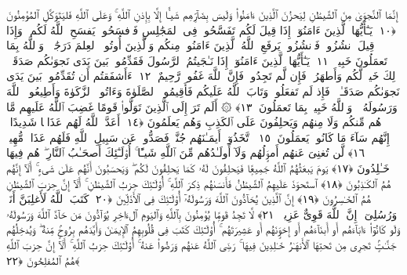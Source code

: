  إِنَّمَا ٱلنَّجوَىٰ مِنَ ٱلشَّيطَٰنِ لِيَحزُنَ ٱلَّذِينَ ءَامَنُوا۟ وَلَيسَ بِضَآرِّهِم شَيـًٔا إِلَّا بِإِذنِ ٱللَّهِ ۚ وَعَلَى ٱللَّهِ فَليَتَوَكَّلِ ٱلمُؤمِنُونَ ﴿١٠﴾
 يَـٰٓأَيُّهَا ٱلَّذِينَ ءَامَنُوٓا۟ إِذَا قِيلَ لَكُم تَفَسَّحُوا۟ فِى ٱلمَجَٰلِسِ فَٱفسَحُوا۟ يَفسَحِ ٱللَّهُ لَكُم ۖ وَإِذَا قِيلَ ٱنشُزُوا۟ فَٱنشُزُوا۟ يَرفَعِ ٱللَّهُ ٱلَّذِينَ ءَامَنُوا۟ مِنكُم وَٱلَّذِينَ أُوتُوا۟ ٱلعِلمَ دَرَجَٰتٍۢ ۚ وَٱللَّهُ بِمَا تَعمَلُونَ خَبِيرٌۭ ﴿١١﴾
 يَـٰٓأَيُّهَا ٱلَّذِينَ ءَامَنُوٓا۟ إِذَا نَـٰجَيتُمُ ٱلرَّسُولَ فَقَدِّمُوا۟ بَينَ يَدَى نَجوَىٰكُم صَدَقَةًۭ ۚ ذَٟلِكَ خَيرٌۭ لَّكُم وَأَطهَرُ ۚ فَإِن لَّم تَجِدُوا۟ فَإِنَّ ٱللَّهَ غَفُورٌۭ رَّحِيمٌ ﴿١٢﴾
 ءَأَشفَقتُم أَن تُقَدِّمُوا۟ بَينَ يَدَى نَجوَىٰكُم صَدَقَـٰتٍۢ ۚ فَإِذ لَم تَفعَلُوا۟ وَتَابَ ٱللَّهُ عَلَيكُم فَأَقِيمُوا۟ ٱلصَّلَوٰةَ وَءَاتُوا۟ ٱلزَّكَوٰةَ وَأَطِيعُوا۟ ٱللَّهَ وَرَسُولَهُۥ ۚ وَٱللَّهُ خَبِيرٌۢ بِمَا تَعمَلُونَ ﴿١٣﴾
 ۞ أَلَم تَرَ إِلَى ٱلَّذِينَ تَوَلَّوا۟ قَومًا غَضِبَ ٱللَّهُ عَلَيهِم مَّا هُم مِّنكُم وَلَا مِنهُم وَيَحلِفُونَ عَلَى ٱلكَذِبِ وَهُم يَعلَمُونَ ﴿١٤﴾
 أَعَدَّ ٱللَّهُ لَهُم عَذَابًۭا شَدِيدًا ۖ إِنَّهُم سَآءَ مَا كَانُوا۟ يَعمَلُونَ ﴿١٥﴾
 ٱتَّخَذُوٓا۟ أَيمَـٰنَهُم جُنَّةًۭ فَصَدُّوا۟ عَن سَبِيلِ ٱللَّهِ فَلَهُم عَذَابٌۭ مُّهِينٌۭ ﴿١٦﴾
 لَّن تُغنِىَ عَنهُم أَموَٟلُهُم وَلَآ أَولَـٰدُهُم مِّنَ ٱللَّهِ شَيـًٔا ۚ أُو۟لَـٰٓئِكَ أَصحَـٰبُ ٱلنَّارِ ۖ هُم فِيهَا خَـٰلِدُونَ ﴿١٧﴾
 يَومَ يَبعَثُهُمُ ٱللَّهُ جَمِيعًۭا فَيَحلِفُونَ لَهُۥ كَمَا يَحلِفُونَ لَكُم ۖ وَيَحسَبُونَ أَنَّهُم عَلَىٰ شَىءٍ ۚ أَلَآ إِنَّهُم هُمُ ٱلكَـٰذِبُونَ ﴿١٨﴾
 ٱستَحوَذَ عَلَيهِمُ ٱلشَّيطَٰنُ فَأَنسَىٰهُم ذِكرَ ٱللَّهِ ۚ أُو۟لَـٰٓئِكَ حِزبُ ٱلشَّيطَٰنِ ۚ أَلَآ إِنَّ حِزبَ ٱلشَّيطَٰنِ هُمُ ٱلخَـٰسِرُونَ ﴿١٩﴾
 إِنَّ ٱلَّذِينَ يُحَآدُّونَ ٱللَّهَ وَرَسُولَهُۥٓ أُو۟لَـٰٓئِكَ فِى ٱلأَذَلِّينَ ﴿٢٠﴾
 كَتَبَ ٱللَّهُ لَأَغلِبَنَّ أَنَا۠ وَرُسُلِىٓ ۚ إِنَّ ٱللَّهَ قَوِىٌّ عَزِيزٌۭ ﴿٢١﴾
 لَّا تَجِدُ قَومًۭا يُؤمِنُونَ بِٱللَّهِ وَٱليَومِ ٱلءَاخِرِ يُوَآدُّونَ مَن حَآدَّ ٱللَّهَ وَرَسُولَهُۥ وَلَو كَانُوٓا۟ ءَابَآءَهُم أَو أَبنَآءَهُم أَو إِخوَٟنَهُم أَو عَشِيرَتَهُم ۚ أُو۟لَـٰٓئِكَ كَتَبَ فِى قُلُوبِهِمُ ٱلإِيمَـٰنَ وَأَيَّدَهُم بِرُوحٍۢ مِّنهُ ۖ وَيُدخِلُهُم جَنَّـٰتٍۢ تَجرِى مِن تَحتِهَا ٱلأَنهَـٰرُ خَـٰلِدِينَ فِيهَا ۚ رَضِىَ ٱللَّهُ عَنهُم وَرَضُوا۟ عَنهُ ۚ أُو۟لَـٰٓئِكَ حِزبُ ٱللَّهِ ۚ أَلَآ إِنَّ حِزبَ ٱللَّهِ هُمُ ٱلمُفلِحُونَ ﴿٢٢﴾
 
